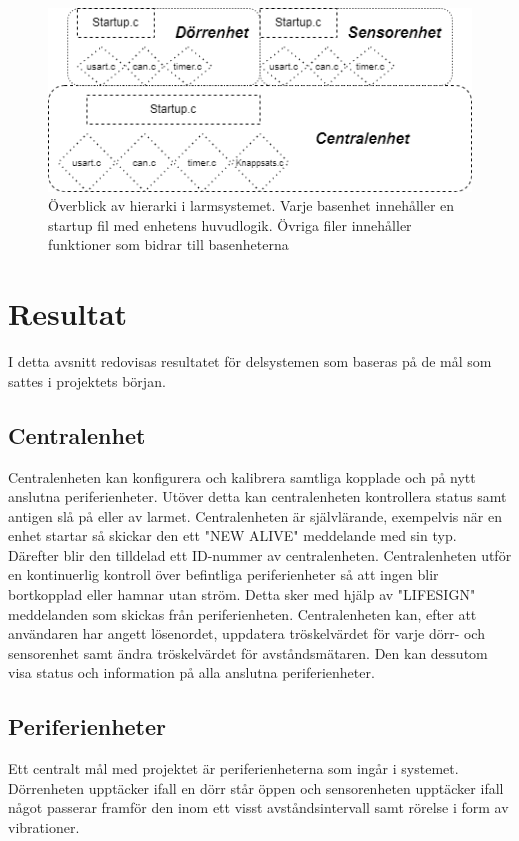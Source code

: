 \documentclass{article}
\begin{document}
\begin{figure}[h]
    \centering
    \includegraphics[scale=0.5]{Projektrapport/hierarki.png}
    \caption {Överblick av hierarki i larmsystemet. Varje basenhet innehåller en startup fil med enhetens huvudlogik. Övriga filer innehåller funktioner som bidrar till basenheterna}
    \label{fig:drawing}
\end{figure}


\section{Resultat}
I detta avsnitt redovisas resultatet för delsystemen som baseras på de mål som sattes i projektets början.\\
\subsection{Centralenhet}
Centralenheten kan konfigurera och kalibrera samtliga kopplade och på nytt anslutna periferienheter.
Utöver detta kan centralenheten kontrollera status samt antigen slå på eller av larmet. 
Centralenheten är självlärande, exempelvis när en enhet startar så skickar den ett "NEW ALIVE" meddelande med sin typ. 
Därefter blir den tilldelad ett ID-nummer av centralenheten. 
Centralenheten utför en kontinuerlig kontroll över befintliga periferienheter så att ingen blir bortkopplad eller hamnar utan ström. 
Detta sker med hjälp av "LIFESIGN" meddelanden som skickas från periferienheten. 
Centralenheten kan, efter att användaren har angett lösenordet, uppdatera tröskelvärdet för varje dörr- och sensorenhet samt ändra tröskelvärdet för avståndsmätaren. 
Den kan dessutom visa status och information på alla anslutna periferienheter.

\subsection{Periferienheter}
Ett centralt mål med projektet är periferienheterna som ingår i systemet. 
Dörrenheten upptäcker ifall en dörr står öppen och sensorenheten upptäcker ifall något passerar framför den inom ett visst avståndsintervall samt rörelse i form av vibrationer.
\end{document}
